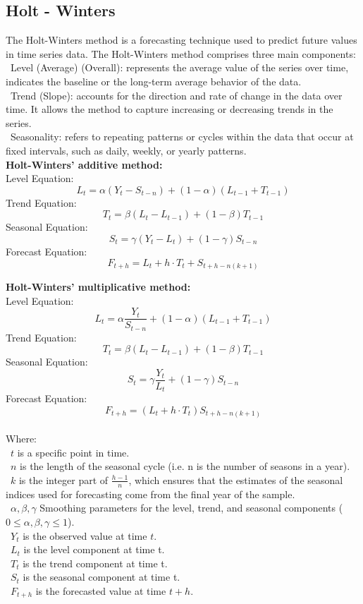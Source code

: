 \documentclass{ieeeojies}
\begin{document}
\subsection{Holt - Winters}
The Holt-Winters \cite{b9} method is a forecasting technique used to predict future values in time series data. The Holt-Winters method comprises three main components:\\
    \indent\textbullet\ Level (Average) (Overall): represents the average value of the series over time, indicates the baseline or the long-term average behavior of the data.\\
    \indent\textbullet\ Trend (Slope): accounts for the direction and rate of change in the data over time. It allows the method to capture increasing or decreasing trends in the series.\\
    \indent\textbullet\ Seasonality: refers to repeating patterns or cycles within the data that occur at fixed intervals, such as daily, weekly, or yearly patterns.\\

\textbf{Holt-Winters’ additive method:}\\
Level Equation: 
    \[L_t = \alpha(Y_t - S_{t-n}) + (1 - \alpha)(L_{t-1} + T_{t-1})\]
Trend Equation: 
    \[T_t = \beta(L_t - L_{t-1}) + (1 - \beta) T_{t-1}\]
Seasonal Equation:
    \[S_t = \gamma(Y_t - L_t) + (1 - \gamma) S_{t-n}\]
Forecast Equation:
    \[F_{t+h} = L_t + h \cdot T_t + S_{t+h-n(k+1)}\]

\textbf{Holt-Winters’ multiplicative method:}\\
Level Equation:
    \[L_t = \alpha \frac{Y_t}{S_{t-n}} + (1 - \alpha)(L_{t-1} + T_{t-1})\]
Trend Equation:
    \[T_t = \beta (L_t - L_{t-1}) + (1 - \beta) T_{t-1}\]
Seasonal Equation:
    \[S_t = \gamma \frac{Y_t}{L_t} + (1 - \gamma) S_{t-n}\]
Forecast Equation:
    \[F_{t+h} = (L_t + h \cdot T_t) S_{t+h-n(k+1)}\]
\\
Where:\\
    \indent\ \(t\) is a specific point in time.\\
    \indent\ \(n\) is the length of the seasonal cycle (i.e. n is the number of seasons in a year).\\
    \indent\ \(k\) is the integer part of \(\frac{h-1}{n}\), which ensures that the estimates of the seasonal indices used for forecasting come from the final year of the sample.\\
    \indent\ \(\alpha, \beta, \gamma\) Smoothing parameters for the level, trend, and seasonal components (\(0 \leq \alpha, \beta, \gamma \leq 1\)). \\
    \indent\ \(Y_t\) is the observed value at time \(t\).\\
    \indent\ \(L_t\) is the level component at time t.\\
    \indent\ \(T_t\) is the trend component at time t.\\
    \indent\ \(S_t\) is the seasonal component at time t.\\
    \indent\ \(F_{t+h}\) is the forecasted value at time \(t+h\).
\end{document}
